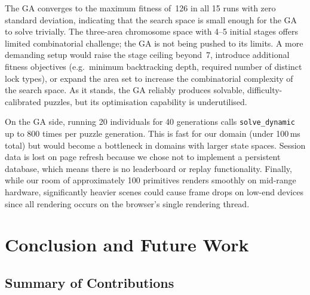 \documentclass[12pt, a4paper]{report}
\begin{document}
The GA converges to the maximum fitness of~126 in all 15 runs with zero standard deviation, indicating that the search space is small enough for the GA to solve trivially.  The three-area chromosome space with 4--5 initial stages offers limited combinatorial challenge; the GA is not being pushed to its limits.  A more demanding setup would raise the stage ceiling beyond~7, introduce additional fitness objectives (e.g.\ minimum backtracking depth, required number of distinct lock types), or expand the area set to increase the combinatorial complexity of the search space.  As it stands, the GA reliably produces solvable, difficulty-calibrated puzzles, but its optimisation capability is underutilised.

On the GA side, running 20 individuals for 40 generations calls \texttt{solve\_dynamic} up to 800 times per puzzle generation.  This is fast for our domain (under 100\,ms total) but would become a bottleneck in domains with larger state spaces.  Session data is lost on page refresh because we chose not to implement a persistent database, which means there is no leaderboard or replay functionality.  Finally, while our room of approximately 100 primitives renders smoothly on mid-range hardware, significantly heavier scenes could cause frame drops on low-end devices since all rendering occurs on the browser's single rendering thread.

\chapter{Conclusion and Future Work}
\label{chap:conclusion}

\section{Summary of Contributions}
\end{document}
